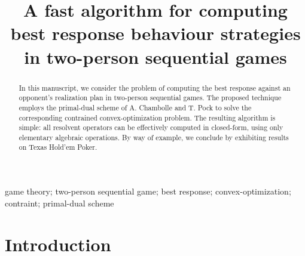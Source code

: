 \documentclass[a4paper,10pt,journal]{IEEEtran}
\begin{document}
\title{A fast algorithm for computing best response behaviour strategies in two-person sequential games}


\author{}


\maketitle

\begin{abstract}
% 
In this manuscript, we consider the problem of computing the best response against an opponent's realization plan in two-person sequential games.
The proposed technique employs the primal-dual scheme of A. Chambolle and T. Pock to solve the corresponding contrained convex-optimization problem.
The resulting algorithm is simple: all resolvent operators can be effectively computed in closed-form, using only elementary algebraic operations.
By way of example, we conclude by exhibiting results on Texas Hold'em Poker.
\end{abstract}


\begin{IEEEkeywords}
  game theory; two-person sequential game; best response; convex-optimization; contraint; primal-dual scheme
\end{IEEEkeywords}

\section{Introduction}
\label{sec:intro}
\end{document}
